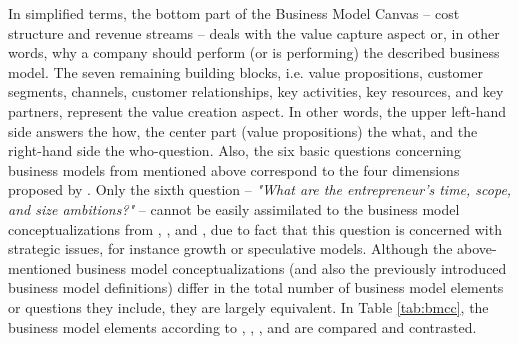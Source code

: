 In simplified terms, the bottom part of the Business Model Canvas -- cost structure and revenue streams -- deals with the value capture aspect or, in other words, why a company should perform (or is performing) the described business model. The seven remaining building blocks, i.e. value propositions, customer segments, channels, customer relationships, key activities, key resources, and key partners, represent the value creation aspect. In other words, the upper left-hand side answers the how, the center part (value propositions) the what, and the right-hand side the who-question. Also, the six basic questions concerning business models from \citet[pp. 729-732]{Morris2005} mentioned above correspond to the four dimensions proposed by \citet{Frankenberger2013}. Only the sixth question -- \textit{"What are the entrepreneur's time, scope, and size ambitions?"} -- cannot be easily assimilated to the business model conceptualizations from \citet{Johnson2008}, \citet{Osterwalder2010}, and \citet{Frankenberger2013}, due to fact that this question is concerned with strategic issues, for instance growth or speculative models. Although the above-mentioned business model conceptualizations (and also the previously introduced business model definitions) differ in the total number of business model elements or questions they include, they are largely equivalent. In Table \ref{tab:bmcc}, the business model elements according to \citet{Johnson2008}, \citet{Osterwalder2010}, \citet{Morris2005}, and \citet{Frankenberger2013} are compared and contrasted.

